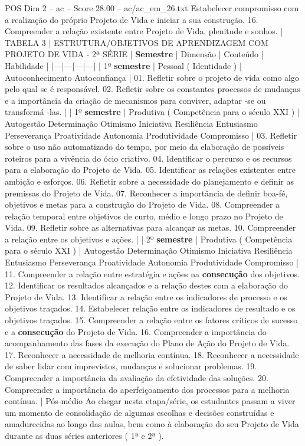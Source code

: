 \begin{textsample}{POS Dim 2 – ac – Score 28.00 – ac/ac\_em\_26.txt}
Estabelecer compromisso com a realização do próprio Projeto de Vida e iniciar a sua construção. 16.
Compreender a relação existente entre Projeto de Vida, plenitude e sonhos. | TABELA 3 | ESTRUTURA/OBJETIVOS DE APRENDIZAGEM COM PROJETO DE VIDA - 2ª SÉRIE | \textbf{Semestre} | Dimensão | Conteúdo | Habilidade | |---|---|---|---| | 1º \textbf{semestre} | Pessoal ( Identidade ) | Autoconhecimento Autoconfiança | 01.
Refletir sobre o projeto de vida como algo pelo qual se é responsável. 02.
Refletir sobre os constantes processos de mudanças e a importância da criação de mecanismos para conviver, adaptar -se ou transformá -las. | | 1º \textbf{semestre} | Produtiva ( Competência para o século XXI ) | Autogestão Determinação Otimismo Iniciativa Resiliência Entusiasmo Perseverança Proatividade Autonomia Produtividade Compromisso | 03.
Refletir sobre o uso não automatizado do tempo, por meio da elaboração de possíveis roteiros para a vivência do ócio criativo. 04.
Identificar o percurso e os recursos para a elaboração do Projeto de Vida. 05.
Identificar as relações existentes entre ambição e esforços. 06.
Refletir sobre a necessidade do planejamento e definir as premissas do Projeto de Vida. 07.
Reconhecer a importância de definir boa-fé, objetivos e metas para a construção do Projeto de Vida. 08.
Compreender a relação temporal entre objetivos de curto, médio e longo prazo no Projeto de Vida. 09.
Refletir sobre as alternativas para alcançar as metas. 10.
Compreender a relação entre os objetivos e ações. | | 2º \textbf{semestre} | Produtiva ( Competência para o século XXI ) | Autogestão Determinação Otimismo Iniciativa Resiliência Entusiasmo Perseverança Proatividade Autonomia Produtividade Compromisso | 11.
Compreender a relação entre estratégia e ações na \textbf{consecução} dos objetivos. 12.
Identificar os resultados alcançados e a relação destes com a elaboração do Projeto de Vida. 13.
Identificar a relação entre os indicadores de processo e os objetivos traçados. 14.
Estabelecer relação entre os indicadores de resultado e os objetivos traçados. 15.
Compreender a relação entre os fatores críticos de sucesso e a \textbf{consecução} do Projeto de Vida. 16.
Compreender a importância do acompanhamento das fases da execução do Plano de Ação do Projeto de Vida. 17.
Reconhecer a necessidade de melhoria contínua. 18.
Reconhecer a necessidade de saber lidar com imprevistos, mudanças e solucionar problemas. 19.
Compreender a importância da avaliação da efetividade das soluções. 20.
Compreender a importância do aperfeiçoamento dos processos para a melhoria contínua. | Pós-médio Ao chegar nesta etapa/série, os estudantes passam a viver um momento de consolidação de algumas escolhas e decisões construídas e amadurecidas ao longo das aulas, bem como à elaboração do seu Projeto de Vida durante as duas séries anteriores ( 1ª e 2ª ).

\end{textsample}
